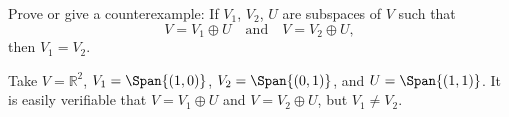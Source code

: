 \documentclass{zupan}
\begin{document}
\begin{problem}{23}
  Prove or give a counterexample: If $V_1$, $V_2$, $U$ are subspaces of $V$
  such that \[V = V_1 \oplus U \quad \text{and} \quad V = V_2 \oplus U,\] then
  $V_1 = V_2$.
\end{problem}

\begin{solution}
  Take $V = \mathbb{R}^2$, $V_1 = \Span\{(1, 0)\}$, $V_2 = \Span\{(0, 1)\}$,
  and $U = \Span\{(1, 1)\}$. It is easily verifiable that $V = V_1 \oplus U$
  and $V = V_2 \oplus U$, but $V_1 \neq V_2$.
\end{solution}
\end{document}
